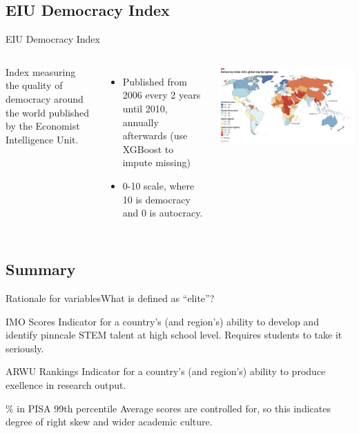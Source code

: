 \documentclass[10pt]{beamer}
\begin{document}
\subsection{EIU Democracy Index}
\begin{frame}{EIU Democracy Index}
    \begin{columns}
        Index measuring the quality of democracy around the world published by the Economist Intelligence Unit.
        \begin{itemize}
            \item Published from 2006 every 2 years until 2010, annually afterwards (use XGBoost to impute missing)
            \item 0-10 scale, where 10 is democracy and 0 is autocracy.
        \end{itemize}

        \centering
        \includegraphics[width=\textwidth]{../charts/eiu_2023.jpg}
    \end{columns}
    
\end{frame}
\subsection{Summary}

\begin{frame}{Rationale for variables}{What is defined as ``elite''?}
    \begin{block}{IMO Scores}
        Indicator for a country's (and region's) ability to develop and identify pinncale STEM talent at high school level. Requires students to take it seriously.
    \end{block}

    \begin{block}{ARWU Rankings}
        Indicator for a country's (and region's) ability to produce exellence in research output.
    \end{block}

    \begin{block}{\% in PISA 99th percentile}
        Average scores are controlled for, so this indicates degree of right skew and wider academic culture.
    \end{block}
\end{frame}
\end{document}
